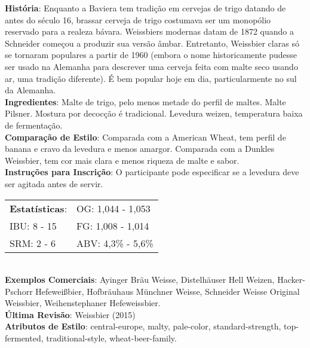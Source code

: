 \textbf{História}: Enquanto a Baviera tem tradição em cervejas de trigo datando de antes do século 16, brassar cerveja de trigo costumava ser um monopólio reservado para a realeza bávara. Weissbiers modernas datam de 1872 quando a Schneider começou a produzir sua versão âmbar. Entretanto, Weissbier claras só se tornaram populares a partir de 1960 (embora o nome historicamente pudesse ser usado na Alemanha para descrever uma cerveja feita com malte seco usando ar, uma tradição diferente). É bem popular hoje em dia, particularmente no sul da Alemanha. \\
\textbf{Ingredientes}: Malte de trigo, pelo menos metade do perfil de maltes. Malte Pilsner. Mostura por decocção é tradicional. Levedura weizen, temperatura baixa de fermentação. \\
\textbf{Comparação de Estilo}: Comparada com a American Wheat, tem perfil de banana e cravo da levedura e menos amargor. Comparada com a Dunkles Weissbier, tem cor mais clara e menos riqueza de malte e sabor. \\
\textbf{Instruções para Inscrição}: O participante pode especificar se a levedura deve ser agitada antes de servir. \\
\begin{tabular}{@{}p{35mm}p{35mm}@{}}
  \textbf{Estatísticas}: & OG: 1,044 - 1,053 \\
  IBU: 8 - 15 & FG: 1,008 - 1,014 \\
  SRM: 2 - 6 & ABV: 4,3\% - 5,6\%
\end{tabular}\\
\textbf{Exemplos Comerciais}: Ayinger Bräu Weisse, Distelhäuser Hell Weizen, Hacker-Pschorr Hefeweißbier, Hofbräuhaus Münchner Weisse, Schneider Weisse Original Weissbier, Weihenstephaner Hefeweissbier. \\
\textbf{Última Revisão}: Weissbier (2015) \\
\textbf{Atributos de Estilo}: central-europe, malty, pale-color, standard-strength, top-fermented, traditional-style, wheat-beer-family.
